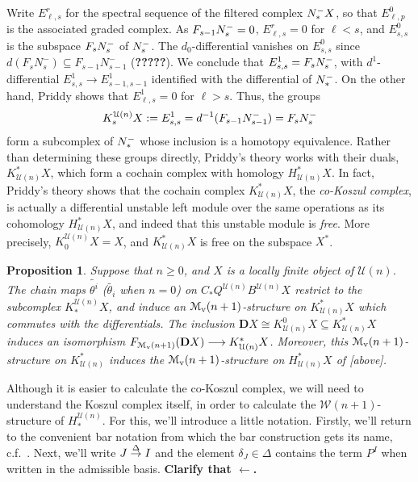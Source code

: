 \documentclass[11pt]{amsart}
\theoremstyle{plain}
\newtheorem{prop}[thm]{Proposition}
\theoremstyle{definition}
\renewcommand{\to}{\longrightarrow}
\newcommand{\calW}{\mathcal{W}}
\newcommand{\calU}{\mathcal{U}}
\newcommand{\calMv}{\mathcal{M}_\textup{v}}
\theoremstyle{plain}
\newcommand{\deltaalg}{\Delta} %
\newcommand{\produces}[3]{#3:#1\sim #2}
\renewcommand{\produces}[3]{#1\rightarrow_{#3} #2}%
\renewcommand{\produces}[3]{#1\overset{\smash{#3}}{\rightarrow} #2}%
\newcommand{\Nop}{N^{\smash{-}}}
\newcommand{\dual}{\mathbf{D}}
\begin{document}
\begin{Koszul complexes}
Write $E^r_{\ell,s}$ for the spectral sequence of the filtered complex $\Nop_*X$, so that $E^0_{\ell,p}$ is the associated graded complex. As $F_{s-1} \Nop_s=0$, $E^r_{\ell,s}=0$ for $\ell<s$, and $E^0_{s,s}$ is the subspace $F_s\Nop_s$ of $\Nop_s$. The $d_0$-differential vanishes on $E^0_{s,s}$ since $d(F_sN_s^-)\subseteq F_{s-1}N_{s-1}^-$ (\textbf{?????}). We conclude that $E^1_{s,s}=F_s\Nop_s$, with $d^1$-differential $E^1_{s,s}\to E^1_{s-1,s-1}$ identified with the differential of $\Nop_*$. On the other hand, Priddy shows that $E^1_{\ell,s}=0$  for $\ell>s$. Thus, the groups
\[K_s^{\calU(n)}X:=E^1_{s,s}=d^{-1}(F_{s-1}\Nop_{s-1})=F_s\Nop_s\]
form a subcomplex of $\Nop_*$ whose inclusion is a homotopy equivalence. Rather than determining these groups directly, Priddy's theory works with their duals, $K^*_{\calU(n)}X$, which form a cochain complex with homology $H^*_{\calU(n)}X$. In fact, Priddy's theory shows that the cochain complex $K^*_{\calU(n)}X$, the \emph{co-Koszul complex}, is actually a differential unstable left module over the same operations as its cohomology $H^*_{\calU(n)}X$, and indeed that this unstable module is \emph{free}. More precisely,  $K_0^{\calU(n)}X= X$, and $K^*_{\calU(n)}X$ is free on the  subspace $X^*$.
\begin{prop}\label{the cokoszul complex is free}
Suppose that $n\geq0$, and $X$ is a locally finite object of $\calU(n)$. The chain maps $\widetilde{\theta^i}$ ($\widetilde{\theta_i}$ when $n=0$) on $C_*Q^{\calU(n)}B^{\calU(n)}X$ restrict to the subcomplex $K_*^{\calU(n)}X$, and induce an $\calMv(n+1)$-structure on $K^*_{\calU(n)}X$ which commutes with the differentials. The inclusion $\dual X\cong K^0_{\calU(n)}X\subseteq K^*_{\calU(n)}X$ induces an isomorphism $F_{\calMv(n+1)}(\dual X)\to K^*_{\calU(n)}X$. Moreover, this $\calMv(n+1)$-structure on $K^*_{\calU(n)}$ induces the $\calMv(n+1)$-structure on $H^*_{\calU(n)}X$ of [above]. 
\end{prop}


Although it is easier to calculate the co-Koszul complex, we will need to understand the Koszul complex itself, in order to calculate the $\calW(n+1)$-structure of $H_*^{\calU(n)}$. For this, we'll introduce a little notation. Firstly, we'll return to the convenient bar notation from which the bar construction gets its name, c.f.\ \cite{PriddyKoszul.pdf}. Next, we'll write $\produces{J}{I}{\deltaalg}$  and the element $\delta_J\in\deltaalg$ contains the term $P^I$ when written in the admissible basis. \textbf{Clarify that $\leftarrow$.}


\end{Koszul complexes}
\end{document}
